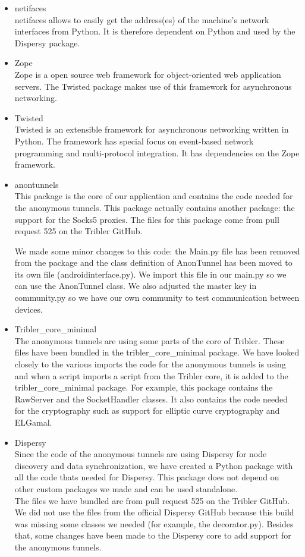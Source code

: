 \begin{itemize}
			\item netifaces\\
			netifaces allows to easily get the address(es) of the machine's network interfaces from Python. It is therefore dependent on Python and used by the Dispersy package.
		
			\item Zope\\
			Zope is a open source web framework for object-oriented web application servers. The Twisted package makes use of this framework for asynchronous networking.
		
			\item Twisted\\
			Twisted is an extensible framework for asynchronous networking written in Python. The framework has special focus on event-based network programming and multi-protocol integration. It has dependencies on the Zope framework.
		
			\item anontunnels\\
			This package is the core of our application and contains the code needed for the anonymous tunnels. This package actually contains another package: the support for the Socks5 proxies. The files for this package come from pull request 525 on the Tribler GitHub.
			
			We made some minor changes to this code: the Main.py file has been removed from the package and the class definition of AnonTunnel has been moved to its own file (androidinterface.py). We import this file in our main.py so we can use the AnonTunnel class. We also adjusted the master key in community.py so we have our own community to test communication between devices.
			
			\item Tribler\_core\_minimal\\
			The anonymous tunnels are using some parts of the core of Tribler. These files have been bundled in the tribler\_core\_minimal package. We have looked closely to the various imports the code for the anonymous tunnels is using and when a script imports a script from the Tribler core, it is added to the tribler\_core\_minimal package. For example, this package contains the RawServer and the SocketHandler classes. It also contains the code needed for the cryptography such as support for elliptic curve cryptography and ELGamal.
			
			\item Dispersy\\
			Since the code of the anonymous tunnels are using Dispersy for node discovery and data synchronization, we have created a Python package with all the code thats needed for Dispersy. This package does not depend on other custom packages we made and can be used standalone.\\
			The files we have bundled are from pull request 525 on the Tribler GitHub. We did not use the files from the official Dispersy GitHub because this build was missing some classes we needed (for example, the decorator.py). Besides that, some changes have been made to the Dispersy core to add support for the anonymous tunnels.
		

\end{itemize}

